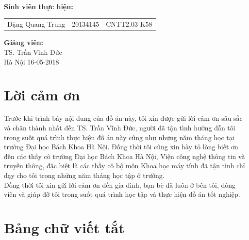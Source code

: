 \documentclass[a4paper,12pt]{report}
\renewcommand{\contentsname}{Mục lục}
\begin{document}
\begin{center}
\hspace{-5cm}\fontsize{14}{16}\selectfont \textbf{Sinh viên thực hiện:}\\[0.1cm] 
\begin{longtable}{l c c}
Đặng Quang Trung & 20134145 & CNTT2.03-K58 
\end{longtable}
\vspace{0.3cm}
\hspace{-8.5cm}\fontsize{14}{16}\selectfont \textbf{Giảng viên:}\\[0.1cm]
\hspace{-2.7cm}\fontsize{14}{16}\selectfont TS. Trần Vĩnh Đức \\[3cm]
\fontsize{16}{19}\selectfont Hà Nội 16-05-2018
\end{center}
\chapter*{Lời cảm ơn}
Trước khi trình bày nội dung của đồ án này, tôi xin được gửi lời cảm ơn sâu sắc và chân thành nhất đến TS. Trần Vĩnh Đức, người đã tận tình hướng đẫn tôi trong suốt quá trình thực hiện đồ án này cũng như những năm tháng học tại trường Đại học Bách Khoa Hà Nội. Đồng thời tôi cũng xin bày tỏ lòng biết ơn đến các thầy cô trường Đại học Bách Khoa Hà Nội, Viện công nghệ thông tin và truyền thông, đặc biệt là các thầy cô bộ môn Khoa học máy tính đã tận tình chỉ dạy cho tôi trong những năm tháng học tập ở trường. \\ 

Đồng thời tôi xin gửi lời cảm ơn đến gia đình, bạn bè đã luôn ở bên tôi, đông viên và giúp đỡ tôi trong suốt quá trình học tập và thực hiện đồ án tốt nghiệp. 

\newpage
\pdfbookmark{\contentsname}{toc}
\tableofcontents
\newpage
\chapter*{Bảng chữ viết tắt}
\printacronyms[include-classes=abbrev,heading=none]

\listoffigures
{}
\end{document}
